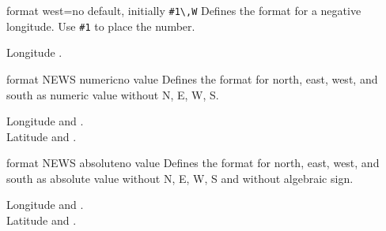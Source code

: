 \begin{docMrcKey}{format west}{=}{no default, initially \texttt{\#1\textbackslash,W}}
  Defines the format  for a negative longitude.
  Use \texttt{\#1} to place the number.
  \begin{dispExample}
    Longitude .
  \end{dispExample}
\end{docMrcKey}


\begin{docMrcKey}{format NEWS numeric}{}{no value}
  Defines the format for north, east, west, and south as numeric value
  without N, E, W, S.
  \begin{dispExample}
    Longitude  and .\\
    Latitude   and .
  \end{dispExample}
\end{docMrcKey}


\begin{docMrcKey}{format NEWS absolute}{}{no value}
  Defines the format for north, east, west, and south as absolute value
  without N, E, W, S and without algebraic sign.
  \begin{dispExample}
    Longitude  and .\\
    Latitude   and .
  \end{dispExample}
\end{docMrcKey}

